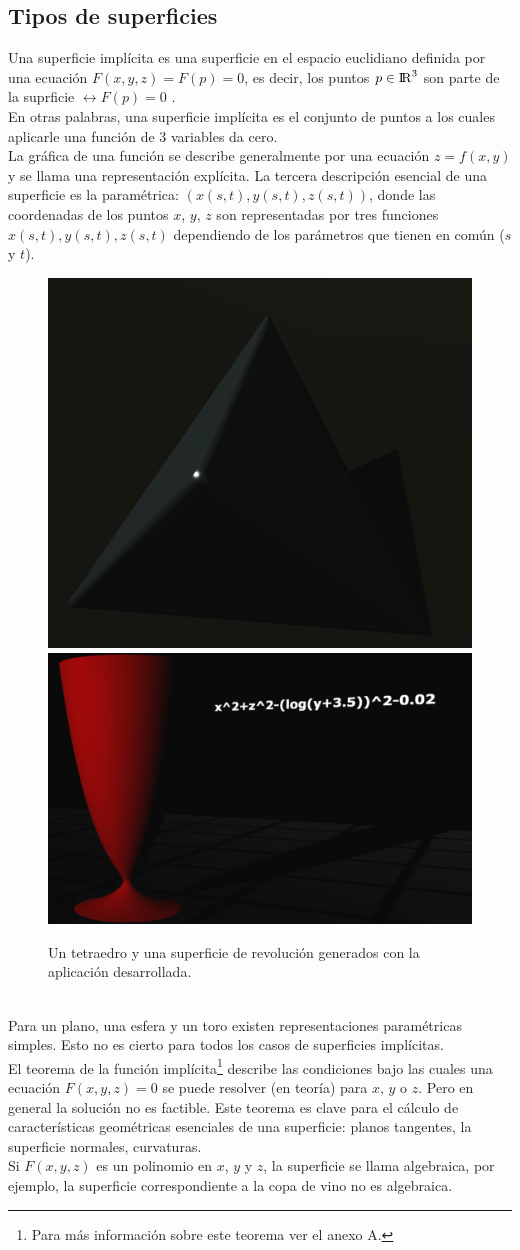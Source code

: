 \documentclass[12pt]{article}
\begin{document}
\subsection{Tipos de superficies}
Una superficie implícita es una superficie en el espacio euclidiano definida por una ecuación $F (x, y, z) =  F(p) = 0$, es decir, los  puntos $ p \in {\rm I\!R} ^3$ son parte de la suprficie $ \leftrightarrow F(p) = 0$ \cite{realtimerendering}.
\\En otras palabras, una superficie implícita es el conjunto de puntos a los cuales aplicarle una función de 3 variables da cero. 
\\La gráfica de una función se describe generalmente por una ecuación $z = f (x, y)$ y se llama una representación explícita\cite{implicitas}\cite{realtimerendering}. La tercera descripción esencial de una superficie es la paramétrica: $(x(s, t), y (s, t), z (s, t))$, donde las coordenadas de los puntos $x$, $y$, $z$ son representadas por tres funciones $x(s, t), y(s, t) , z(s, t)$ dependiendo de los parámetros que tienen en común ($s$ y $t$).
\begin{figure}[ht]
\includegraphics[width =0.45\linewidth]{tetraedro.png}
\hfill
\includegraphics[width =0.45\linewidth]{copa.png}
\caption{ Un tetraedro y una superficie de revolución generados con la aplicación desarrollada.}
\label{ fig : surface }
\end{figure}
\\Para un plano, una esfera y un toro existen representaciones paramétricas simples. Esto no es cierto para todos los casos de superficies implícitas.
\\El teorema de la función implícita\footnote{Para más información sobre este teorema ver el anexo A.} describe las condiciones bajo las cuales una ecuación $F (x, y, z) = 0$ se puede resolver (en teoría) para $x$, $y$ o $z$. Pero en general la solución no es factible. Este teorema es clave para el cálculo de características geométricas esenciales de una superficie: planos tangentes, la superficie normales, curvaturas.
\\Si $F (x, y, z)$ es un polinomio en $x$, $y$ y $z$, la superficie se llama algebraica,  por ejemplo, la superficie correspondiente a la copa de vino no es algebraica.
\end{document}
